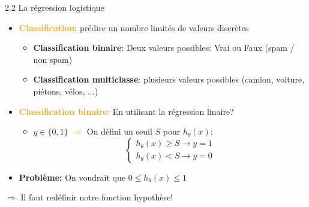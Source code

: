\begin{frame}{2.2 La régression logistique}
  \begin{itemize}
  \item \textbf{\textcolor{orange}{Classification}}: prédire un nombre limités de valeurs discrètes
    \begin{itemize}
    \item \textbf{Classification binaire}: Deux valeurs possibles: Vrai ou Faux (spam / non spam)
    \item \textbf{Classification multiclasse}: plusieurs valeurs possibles (camion, voiture, piétons, vélos, ...)
    \end{itemize}
    \vspace{0.5cm}
  \item \textcolor{orange}{\textbf{Classification binaire:}} En utilisant la régression linaire?
    \begin{itemize}
    \item $y \in \{0,1\}$ \textcolor{orange}{$\Rightarrow$} On défini un seuil $S$ pour $h_{\theta}(x)$:
      \begin{equation*}
        \begin{cases}
          h_{\theta}(x) \geq S \rightarrow y = 1\\
          h_{\theta}(x) < S \rightarrow y = 0
        \end{cases}
      \end{equation*}
    \end{itemize}
  \item \textbf{Problème:} On voudrait que $0 \leq h_{\theta}(x) \leq 1$
  \end{itemize}
  \begin{center}
    $\Rightarrow$ Il faut redéfinir notre fonction hypothèse!
  \end{center}
\end{frame}

